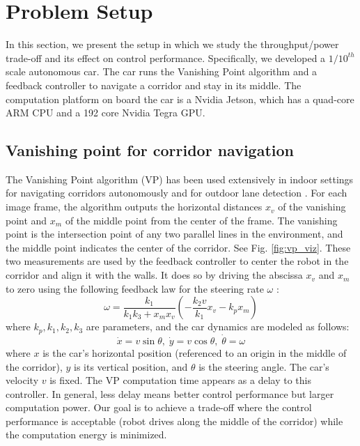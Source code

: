 \section{Problem Setup}
\label{sec:problemSetup}
In this section, we present the setup in which we study the throughput/power trade-off and its effect on control performance. 
Specifically, we developed a $1/10^{th}$ scale autonomous car.
The car runs the Vanishing Point algorithm \cite{VP1,VP2} and a feedback controller to navigate a corridor and stay in its middle.
The computation platform on board the car is a Nvidia Jetson, which has a quad-core ARM CPU and a 192 core Nvidia Tegra GPU.


\subsection{Vanishing point for corridor navigation}
\label{sec:vp}
The Vanishing Point algorithm (VP) \cite{VP1} has been used extensively in indoor settings for navigating corridors autonomously \cite{VP2, VP3} and for outdoor lane detection \cite{gallagher2002ground}.
For each image frame, the algorithm outputs the horizontal distances $x_v$ of the vanishing point and $x_m$ of the middle point from the center of the frame. 
The vanishing point is the intersection point of any two parallel lines in the environment, and the middle point indicates the center of the corridor. 
See Fig. \ref{fig:vp_viz}.
These two measurements are used by the feedback controller to center the robot in the corridor and align it with the walls. 
It does so by driving the abscissa $x_v$ and $x_m$ to zero using the following feedback law for the steering rate $\omega$ \cite{VP2}:
\begin{equation}
\omega = \frac{k_1}{k_1k_3+x_mx_v}(-\frac{k_2v}{k_1}x_v -k_px_m)
\label{eq:controller}
\end{equation}
where $k_p,k_1,k_2,k_3$ are parameters, and the car dynamics are modeled as follows:
\begin{equation}
\dot{x} = v\sin\theta,\; \dot{y} = v\cos\theta, \;\dot{\theta} = \omega 
\end{equation}
where $x$ is the car's horizontal position (referenced to an origin in the middle of the corridor), $y$ is its vertical position, and $\theta$ is the steering angle.
The car's velocity $v$ is fixed.
The VP computation time appears as a delay to this controller. 
In general, less delay means better control performance but larger computation power. 
Our goal is to achieve a trade-off where the control performance is acceptable (robot drives along the middle of the corridor) while the computation energy is minimized. 

